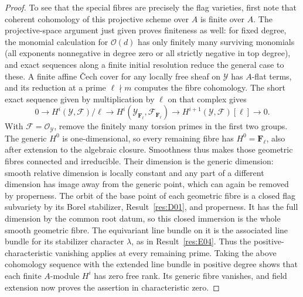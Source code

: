 \documentclass[11pt,a4paper,openany,oneside]{book}
\theoremstyle{resultstyle}
\theoremstyle{definition}
\numberwithin{equation}{chapter}
\begin{document}
\begin{proof}
To see that the special fibres are precisely the flag
varieties, first note that coherent cohomology of this
projective scheme over \(A\) is finite over \(A\).
The projective-space argument just given proves finiteness
as well: for fixed degree, the monomial calculation for
\(\mathcal O(d)\) has only finitely many surviving monomials
(all exponents nonnegative in degree zero or all strictly
negative in top degree), and exact sequences along a
finite initial resolution reduce the general case to these.
A finite affine Čech cover for any locally free sheaf
on \(\mathcal Y\) has \(A\)-flat terms, and its reduction
at a prime \(\ell\nmid m\) computes the fibre cohomology.
The short exact sequence given by multiplication by \(\ell\)
on that complex gives
\[
 0\longrightarrow H^i(\mathcal Y,\mathcal F)/\ell
   \longrightarrow H^i(\mathcal Y_{\mathbf F_\ell},
                          \mathcal F_{\mathbf F_\ell})
   \longrightarrow H^{i+1}(\mathcal Y,\mathcal F)[\ell]
   \longrightarrow0 .
\]
With \(\mathcal F=\mathcal O_{\mathcal Y}\), remove the
finitely many torsion primes in the first two groups.
The generic \(H^0\) is one-dimensional, so every remaining
fibre has \(H^0=\mathbf F_\ell\), also after extension to
the algebraic closure. Smoothness thus makes those
geometric fibres connected and irreducible.
Their dimension is the generic dimension: smooth relative
dimension is locally constant and any part of a different
dimension has image away from the generic point, which
can again be removed by properness.
The orbit of the base point of each geometric fibre is
a closed flag subvariety by its Borel stabilizer,
Result~\ref{res:D01}, and properness.
It has the full dimension by the common root datum,
so this closed immersion is the whole smooth geometric
fibre. The equivariant line bundle on it is the
associated line bundle for its stabilizer character
\(\lambda\), as in Result~\ref{res:E04}.
Thus the positive-characteristic vanishing applies
at every remaining prime. Taking the above cohomology
sequence with the extended line bundle in positive degree
shows that each finite \(A\)-module \(H^i\) has zero
free rank. Its generic fibre vanishes, and field extension
now proves the assertion in characteristic zero.
\end{proof}
\end{document}
